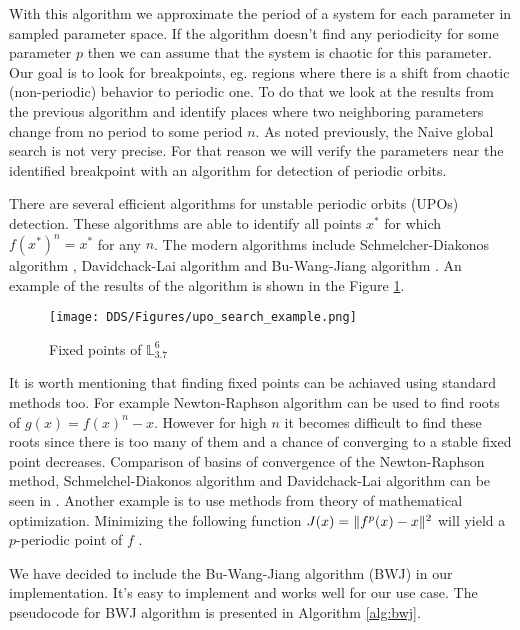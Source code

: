 With this algorithm we approximate the period of a system for each parameter in sampled parameter space.
If the algorithm doesn't find any periodicity for some parameter $p$ then we can assume that the system is chaotic for this parameter.
Our goal is to look for breakpoints, eg. regions where there is a shift from chaotic (non-periodic) behavior to periodic one.
To do that we look at the results from the previous algorithm and identify places where two neighboring parameters change from no period to some period $n$.
As noted previously, the Naive global search is not very precise. For that reason we will verify the parameters near the identified breakpoint with an algorithm for detection of periodic orbits.
\par
There are several efficient algorithms for unstable periodic orbits (UPOs) detection.
These algorithms are able to identify all points $x^{*}$ for which $f(x^{*})^{n}=x^{*}$ for any $n$.
The modern algorithms include Schmelcher-Diakonos algorithm \cite{Schmelcher1997}, Davidchack-Lai algorithm \cite{Davidchack1999,Davidchack2001,Klebanoff2001} and Bu-Wang-Jiang algorithm \cite{Bu2004}.
An example of the results of the algorithm is shown in the Figure \ref{fig:upo_search_example}.

\begin{figure}[!h]
    \centering
    \texttt{[image: DDS/Figures/upo\_search\_example.png]}
    \caption{Fixed points of $\mathbb{L}_{3.7}^{6}$}
    \label{fig:upo_search_example}
\end{figure}

\par
It is worth mentioning that finding fixed points can be achiaved using standard methods too.
For example Newton-Raphson algorithm can be used to find roots of $g(x) = f(x)^{n} - x$.
However for high $n$ it becomes difficult to find these roots since there is too many of them and a chance of converging to a stable fixed point decreases.
Comparison of basins of convergence of the Newton-Raphson method, Schmelchel-Diakonos algorithm and Davidchack-Lai algorithm can be seen in \cite{Davidchack1999}.
Another example is to use methods from theory of mathematical optimization.
Minimizing the following function $J(x)= \lVert f^{p}(x)-x\rVert^{2}$ will yield a $p$-periodic point of $f$ \cite{Fuh2009}.
\par
We have decided to include the Bu-Wang-Jiang algorithm (BWJ) in our implementation.
It's easy to implement and works well for our use case.
The pseudocode for BWJ algorithm is presented in Algorithm \ref{alg:bwj}.

